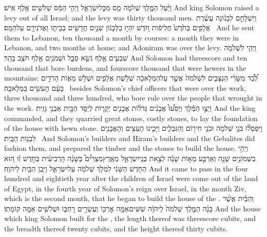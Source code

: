 {וַיַּ֨עַל הַמֶּ֧לֶךְ שְׁלֹמֹ֛ה מַ֖ס מִכׇּל\maqqaf יִשְׂרָאֵ֑ל וַיְהִ֣י הַמַּ֔ס שְׁלֹשִׁ֥ים אֶ֖לֶף אִֽישׁ׃}
{And king Solomon raised a levy out of all Israel; and the levy was thirty thousand men.}
{וַיִּשְׁלָחֵ֣ם לְבָנ֗וֹנָה עֲשֶׂ֨רֶת אֲלָפִ֤ים בַּחֹ֙דֶשׁ֙ חֲלִיפ֔וֹת חֹ֚דֶשׁ יִהְי֣וּ בַלְּבָנ֔וֹן שְׁנַ֥יִם חֳדָשִׁ֖ים בְּבֵית֑וֹ וַאֲדֹנִירָ֖ם עַל\maqqaf הַמַּֽס׃ \setuma }
{And he sent them to Lebanon, ten thousand a month by courses: a month they were in Lebanon, and two months at home; and Adoniram was over the levy.}
{וַיְהִ֧י לִשְׁלֹמֹ֛ה שִׁבְעִ֥ים אֶ֖לֶף נֹשֵׂ֣א סַבָּ֑ל וּשְׁמֹנִ֥ים אֶ֖לֶף חֹצֵ֥ב בָּהָֽר׃}
{And Solomon had threescore and ten thousand that bore burdens, and fourscore thousand that were hewers in the mountains;}
{לְ֠בַ֠ד מִשָּׂרֵ֨י הַנִּצָּבִ֤ים לִשְׁלֹמֹה֙ אֲשֶׁ֣ר עַל\maqqaf הַמְּלָאכָ֔ה שְׁלֹ֥שֶׁת אֲלָפִ֖ים וּשְׁלֹ֣שׁ מֵא֑וֹת הָרֹדִ֣ים בָּעָ֔ם הָעֹשִׂ֖ים בַּמְּלָאכָֽה׃ \setuma }
{besides Solomon’s chief officers that were over the work, three thousand and three hundred, who bore rule over the people that wrought in the work.}
{וַיְצַ֣ו הַמֶּ֡לֶךְ וַיַּסִּ֩עוּ֩ אֲבָנִ֨ים גְּדֹל֜וֹת אֲבָנִ֧ים יְקָר֛וֹת לְיַסֵּ֥ד הַבָּ֖יִת אַבְנֵ֥י גָזִֽית׃}
{And the king commanded, and they quarried great stones, costly stones, to lay the foundation of the house with hewn stone.}
{וַֽיִּפְסְל֞וּ בֹּנֵ֧י שְׁלֹמֹ֛ה וּבֹנֵ֥י חִיר֖וֹם וְהַגִּבְלִ֑ים וַיָּכִ֛ינוּ הָעֵצִ֥ים וְהָאֲבָנִ֖ים לִבְנ֥וֹת הַבָּֽיִת׃ \petucha }
{And Solomon’s builders and Hiram’s builders and the Gebalites did fashion them, and prepared the timber and the stones to build the house.}
\newperek
{}
{וַיְהִ֣י בִשְׁמוֹנִ֣ים שָׁנָ֣ה וְאַרְבַּ֣ע מֵא֣וֹת שָׁנָ֡ה לְצֵ֣את בְּנֵֽי\maqqaf יִשְׂרָאֵ֣ל מֵאֶֽרֶץ\maqqaf מִצְרַ֩יִם֩ בַּשָּׁנָ֨ה הָרְבִיעִ֜ית בְּחֹ֣דֶשׁ זִ֗ו ה֚וּא הַחֹ֣דֶשׁ הַשֵּׁנִ֔י לִמְלֹ֥ךְ שְׁלֹמֹ֖ה עַל\maqqaf יִשְׂרָאֵ֑ל וַיִּ֥בֶן הַבַּ֖יִת לַיהֹוָֽה׃}
{And it came to pass in the four hundred and eightieth year after the children of Israel were come out of the land of Egypt, in the fourth year of Solomon’s reign over Israel, in the month Ziv, which is the second month, that he began to build the house of the \lord.}
{וְהַבַּ֗יִת אֲשֶׁ֨ר בָּנָ֜ה הַמֶּ֤לֶךְ שְׁלֹמֹה֙ לַיהֹוָ֔ה שִׁשִּׁים\maqqaf אַמָּ֥ה אׇרְכּ֖וֹ וְעֶשְׂרִ֣ים רׇחְבּ֑וֹ וּשְׁלֹשִׁ֥ים אַמָּ֖ה קוֹמָתֽוֹ׃}
{And the house which king Solomon built for the \lord, the length thereof was threescore cubits, and the breadth thereof twenty cubits, and the height thereof thirty cubits.}
